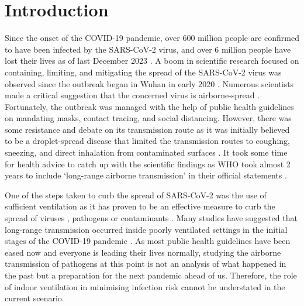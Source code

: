 \documentclass[a4paper,12pt]{elsarticle}
\begin{document}

\section{Introduction}
\label{sec:sample1}

Since the onset of the COVID-19 pandemic, over 600 million people are confirmed to have been infected by the SARS-CoV-2 virus, and over 6 million people have lost their lives as of last December 2023 \cite{world2023therapeutics}. A boom in scientific research focused on containing, limiting, and mitigating the spread of the SARS-CoV-2 virus was observed since the outbreak began in Wuhan in early 2020 \cite{morawska2020can,morawska2020time}. Numerous scientists made a critical suggestion that the concerned virus is airborne-spread \cite{zhang2020identifying,bazant2021guideline,morawska2020airborne}. Fortunately, the outbreak was managed with the help of public health guidelines on mandating masks, contact tracing, and social distancing. However, there was some resistance and debate on its transmission route as it was initially believed to be a droplet-spread disease that limited the transmission routes to coughing, sneezing, and direct inhalation from contaminated surfaces \citep{chagla2021re}. It took some time for health advice to catch up with the scientific findings as WHO took almost 2 years to include `long-range airborne transmission' in their official statements \cite{lewis2022took}. 

One of the steps taken to curb the spread of SARS-CoV-2 was the use of sufficient ventilation as it has proven to be an effective measure to curb the spread of viruses \cite{ren2021numerical}, pathogens \cite{berrouk2010experimental} or contaminants \cite{li2020investigating}. Many studies have suggested that long-range transmission occurred inside poorly ventilated settings in the initial stages of the COVID-19 pandemic \cite{morawska2020can,li2021probable, liu2021simulation}. As most public health guidelines have been eased now and everyone is leading their lives normally, studying the airborne transmission of pathogens at this point is not an analysis of what happened in the past but a preparation for the next pandemic ahead of us. Therefore, the role of indoor ventilation in minimising infection risk cannot be understated in the current scenario.
\end{document}
